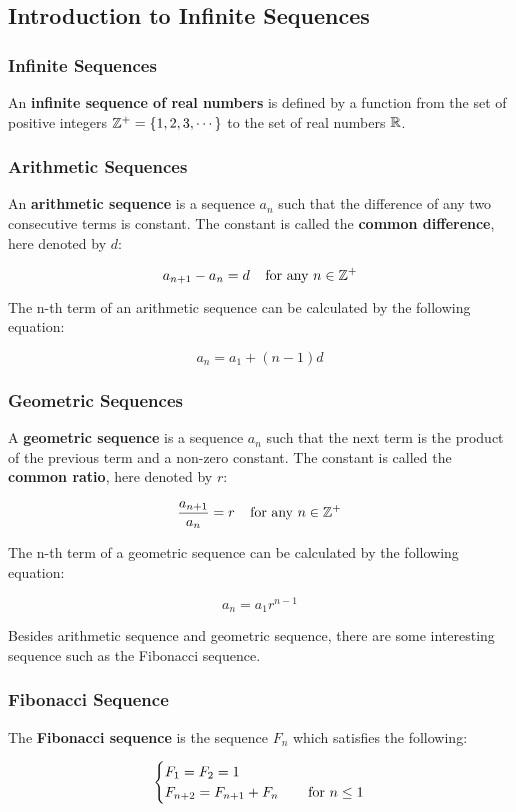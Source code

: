 \documentclass[a4paper,12pt]{article}
\begin{document}
\subsection{Introduction to Infinite Sequences}
\subsubsection{Infinite Sequences}
\begin{dft}
  An \textbf{infinite sequence of real numbers} is defined by a function from the set of positive integers $\mathbb{Z}^{+}=\left\{ 1,2,3,\cdots\right\}$ to the set of real numbers $\mathbb{R}$.
\end{dft}

\subsubsection{Arithmetic Sequences}
\begin{dft}
  An \textbf{arithmetic sequence} is a sequence $a_{n}$ such that the difference of any two consecutive terms is constant. The constant is called the \textbf{common difference}, here denoted by $d$:

  $$a_{n+1}-a_{n}=d\;\;\;\;\text{for any }n\in\mathbb{Z}^{+}$$
\end{dft}\n

The n-th term of an arithmetic sequence can be calculated by the following equation:

$$a_{n}=a_{1}+(n-1)d$$

\subsubsection{Geometric Sequences}
\begin{dft}
  A \textbf{geometric sequence} is a sequence $a_{n}$ such that the next term is the product of the previous term and a non-zero constant. The constant is called the \textbf{common ratio}, here denoted by $r$:

  $$\frac{a_{n+1}}{a_{n}}=r\;\;\;\;\text{for any }n\in\mathbb{Z}^{+}$$
\end{dft}\n

The n-th term of a geometric sequence can be calculated by the following equation:

$$a_{n}=a_{1}r^{n-1}$$\s

Besides arithmetic sequence and geometric sequence, there are some interesting sequence such as the Fibonacci sequence.

\subsubsection{Fibonacci Sequence}
\begin{dft}
  The \textbf{Fibonacci sequence} is the sequence $F_{n}$ which satisfies the following:

  $$\begin{cases}
    F_{1}=F_{2}=1&\\
    F_{n+2}=F_{n+1}+F_{n}&\;\;\;\;\text{for }n\leq 1
  \end{cases}$$
\end{dft}\n
\end{document}
